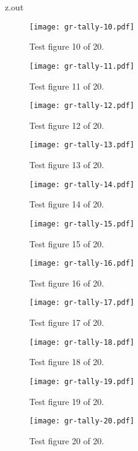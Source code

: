 \begin{VerbatimOut}{z.out}
\begin{figure}[ht]
  \centering
  \texttt{[image: gr-tally-10.pdf]}
  \caption{Test figure 10 of 20.}
  \label{fi:10of20}
\end{figure}

\begin{figure}[ht]
  \centering
  \texttt{[image: gr-tally-11.pdf]}
  \caption{Test figure 11 of 20.}
  \label{fi:11of20}
\end{figure}

\begin{figure}[ht]
  \centering
  \texttt{[image: gr-tally-12.pdf]}
  \caption{Test figure 12 of 20.}
  \label{fi:12of20}
\end{figure}

\begin{figure}[ht]
  \centering
  \texttt{[image: gr-tally-13.pdf]}
  \caption{Test figure 13 of 20.}
  \label{fi:13of20}
\end{figure}

\begin{figure}[ht]
  \centering
  \texttt{[image: gr-tally-14.pdf]}
  \caption{Test figure 14 of 20.}
  \label{fi:14of20}
\end{figure}

\begin{figure}[ht]
  \centering
  \texttt{[image: gr-tally-15.pdf]}
  \caption{Test figure 15 of 20.}
  \label{fi:15of20}
\end{figure}

\begin{figure}[ht]
  \centering
  \texttt{[image: gr-tally-16.pdf]}
  \caption{Test figure 16 of 20.}
  \label{fi:16of20}
\end{figure}

\begin{figure}[ht]
  \centering
  \texttt{[image: gr-tally-17.pdf]}
  \caption{Test figure 17 of 20.}
  \label{fi:17of20}
\end{figure}

\begin{figure}[ht]
  \centering
  \texttt{[image: gr-tally-18.pdf]}
  \caption{Test figure 18 of 20.}
  \label{fi:18of20}
\end{figure}

\begin{figure}[ht]
  \centering
  \texttt{[image: gr-tally-19.pdf]}
  \caption{Test figure 19 of 20.}
  \label{fi:19of20}
\end{figure}

\begin{figure}[ht]
  \centering
  \texttt{[image: gr-tally-20.pdf]}
  \caption{Test figure 20 of 20.}
  \label{fi:20of20}
\end{figure}
\end{VerbatimOut}

\MyIO
